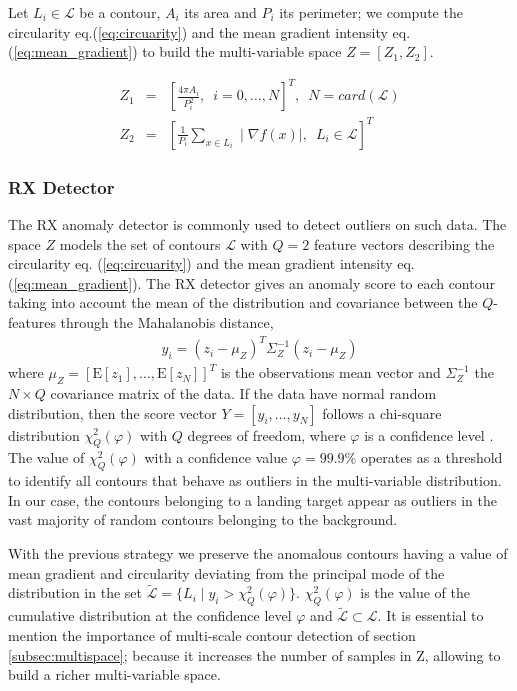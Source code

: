 Let $L_{i} \in \mathcal{L}$ be a contour, $A_{i}$ its area and $P_{i}$ its perimeter; we compute the circularity eq.(\ref{eq:circuarity}) and the mean gradient intensity eq. (\ref{eq:mean_gradient}) to build the multi-variable space $Z=[Z_{1}, Z_{2}]$. 

\begin{eqnarray}
Z_{1}&=&\left[\frac{4\pi A_{i}}{P_{i}^2}, \enspace i=0, \ldots, N\right]^T,  \enspace N = card(\mathcal{L}) \label{eq:circuarity}  \\ 
Z_{2}&=&\left[\frac{1}{P_{i}}\sum\limits_{x \in L_{i}} \mid\nabla f(x) \mid, \enspace L_{i} \in \mathcal{L}\right]^T  \label{eq:mean_gradient}
\end{eqnarray}

\subsubsection{RX Detector}\label{subsec:rx_detector}
The RX anomaly detector \citep{Reed.Yu:TASSP:1990} is commonly used to detect outliers on such data. The space $Z$ models the set of contours $\mathcal{L}$ with $Q=2$ feature vectors describing the circularity eq. (\ref{eq:circuarity}) and the mean gradient intensity eq.(\ref{eq:mean_gradient}). The RX detector gives an anomaly score to each contour taking into account the mean of the distribution and covariance between the $Q$-features through the Mahalanobis distance,
\begin{eqnarray}\label{eq:RX_detector}
y_{i}= (z_{i}-\mu_{Z})^{T}\Sigma^{-1}_{Z}(z_{i}-\mu_{Z})
\end{eqnarray}
where $\mu_{Z}=[\mathrm{E}[z_{1}], \ldots, \mathrm{E}[z_{N}]]^T$ is the  observations mean vector and $\Sigma^{-1}_{Z}$ the $N\times Q$ covariance matrix of the data. If the data have normal random distribution, then the score vector $Y=[y_{i}, \ldots, y_{N}]$ follows a chi-square distribution $\chi^{2}_{Q}(\varphi)$ with $Q$ degrees of freedom, where $\varphi$ is a confidence level \citep{Lu.Chen.ea:IJAIT:2004}. The value of $\chi^{2}_{Q}(\varphi)$ with a confidence value $\varphi=99.9\%$ operates as a threshold to identify all contours that behave as outliers in the multi-variable distribution. In our case, the contours belonging to a landing target appear as outliers in the vast majority of random contours belonging to the background.

With the previous strategy we preserve the anomalous contours having a value of mean gradient and circularity deviating from the principal mode of the distribution in the set $\widetilde{\mathcal{L}}=\{L_{i}\mid y_{i}>\chi^{2}_{Q}(\varphi)\}$. $\chi^{2}_{Q}(\varphi)$ is the value of the cumulative distribution at the confidence level $\varphi$ and $\widetilde{\mathcal{L}} \subset \mathcal{L}$. It is essential to mention the importance of multi-scale contour detection of section \ref{subsec:multispace}; because it increases the number of samples in Z, allowing to build a richer multi-variable space.

